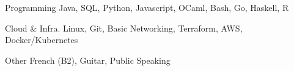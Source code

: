 


\begin{cvskills}


\cvskill
{Programming} %
{Java, SQL, Python, Javascript, OCaml, Bash, Go, Haskell, R} %


\cvskill
{Cloud \& Infra.} %
{Linux, Git, Basic Networking, Terraform, AWS, Docker/Kubernetes} %


\cvskill
{Other} %
{French (B2), Guitar, Public Speaking} %


\end{cvskills}
